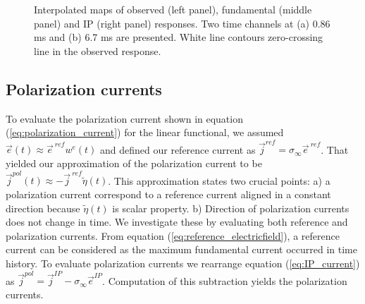 \documentclass[extra,mreferee]{gji}
\newcommand{\siginf}{\sigma_\infty}
\renewcommand {\j}  { {\vec j} }
\newcommand {\e}  { {\vec e} }
\newcommand{\peta}{\tilde{\eta}}
\newcommand{\eref}{\e^{\ ref}}
\begin{document}
\begin{figure}
  \caption{Interpolated maps of observed (left panel), fundamental (middle panel) and IP (right panel) responses. Two time channels at (a) 0.86 ms and (b) 6.7 ms are presented. White line contours zero-crossing line in the observed response.  
  }
  \label{F:IPresp_Plan}
\end{figure}
\clearpage

\subsection{Polarization currents}
To evaluate the polarization current shown in equation (\ref{eq:polarization_current}) for the linear functional, we assumed $\e(t) \approx \eref w^e(t)$ and defined our reference current as $\j^{ref}=\siginf \eref$. That yielded our approximation of the polarization current to be $\j^{pol}(t) \approx -\j^{\ ref} \peta(t)$. This approximation states two crucial points: a) a polarization current correspond to a reference current aligned in a constant direction because $\peta(t)$ is scalar property. b) Direction of polarization currents does not change in time. 
We investigate these by evaluating both reference and polarization currents. 
From equation (\ref{eq:reference_electricfield}), a reference current can be considered as the maximum fundamental current occurred in time history. 
To evaluate polarization currents we rearrange equation (\ref{eq:IP_current}) as $\j^{pol} = \j^{IP} - \siginf\e^{IP}$. Computation of this subtraction yields the polarization currents. 
\end{document}
